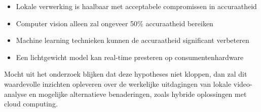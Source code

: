 \begin{itemize}
    \item Lokale verwerking is haalbaar met acceptabele compromissen in accuraatheid
    \item Computer vision alleen zal ongeveer 50\% accuraatheid bereiken
    \item Machine learning technieken kunnen de accuraatheid significant verbeteren
    \item Een lichtgewicht model kan real-time presteren op consumentenhardware
\end{itemize}

Mocht uit het onderzoek blijken dat deze hypotheses niet kloppen, dan zal dit waardevolle inzichten opleveren over de werkelijke uitdagingen van lokale video-analyse en mogelijke alternatieve benaderingen, zoals hybride oplossingen met cloud computing.

